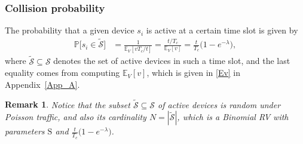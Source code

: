 \documentclass[10pt,journal,a4paper]{IEEEtran}
\newtheorem{remark}{Remark}
\begin{document}
	\subsubsection{Collision probability}
	The probability that a given device $s_i$ is active at a certain time slot is given by
	\begin{align}
	\mathbb{P}\big[s_i\in \tilde{\mathcal{S}}\big]&=\frac{1}{\mathbb{E}_V[vT_c/t]}=\frac{t/T_c}{\mathbb{E}_V[v]}
	=\frac{t}{T_c}\big(1-e^{-\lambda}\big), \label{ps}
	\end{align}
	where $\tilde{\mathcal{S}}\subseteq\mathcal{S}$ denotes the set of active devices in such a time slot, and the last equality comes from computing $\mathbb{E}_V[v]$, which is given in \eqref{Ev} in Appendix~\ref{App_A}.
	\begin{remark}\label{re7}
		Notice that the subset $\tilde{\mathcal{S}}\subseteq\mathcal{S}$ of active devices is random under Poisson traffic, and also its cardinality $N=|\tilde{\mathcal{S}}|$, which is a Binomial RV with parameters $\mathrm{S}$ and $\frac{t}{T_c}\big(1-e^{-\lambda}\big)$.
	\end{remark}
	
\end{document}
